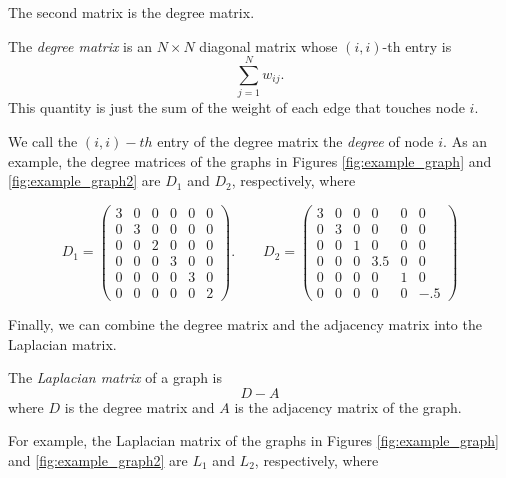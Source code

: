 The second matrix is the degree matrix. 
\begin{definition} The \emph{degree matrix} is an $N \times N$ diagonal matrix whose $(i,i)$-th entry is
\[ 
\sum_{j=1}^N w_{ij}.
\]
This quantity is just the sum of the weight of each edge that touches node $i$.
\end{definition}
We call the $(i, i)-th$ entry of the degree matrix the \emph{degree} of node $i$. As an example, the degree matrices of the graphs in Figures \ref{fig:example_graph} and \ref{fig:example_graph2} are $D_1$ and $D_2$, respectively, where

\[
D_1 = \begin{pmatrix}
3 & 0 & 0 & 0 & 0 & 0\\
0 & 3 & 0 & 0 & 0 & 0\\
0 & 0 & 2 & 0 & 0 & 0\\
0 & 0 & 0 & 3 & 0 & 0\\
0 & 0 & 0 & 0 & 3 & 0\\
0 & 0 & 0 & 0 & 0 & 2
\end{pmatrix}. \qquad D_2 = 
 \begin{pmatrix}
3 & 0 & 0 & 0 & 0 & 0\\
0 & 3 & 0 & 0 & 0 & 0\\
0 & 0 & 1 & 0 & 0 & 0\\
0 & 0 & 0 & 3.5 & 0 & 0\\
0 & 0 & 0 & 0 & 1 & 0\\
0 & 0 & 0 & 0 & 0 & -.5
\end{pmatrix}
\]

Finally, we can combine the degree matrix and the adjacency matrix into the Laplacian matrix.
\begin{definition}
The \emph{Laplacian matrix} of a graph is 
\[D - A \]
where $D$ is the degree matrix and $A$ is the adjacency matrix of the graph.
\end{definition}

For example, the Laplacian matrix of the graphs in Figures \ref{fig:example_graph} and \ref{fig:example_graph2} are $L_1$ and $L_2$, respectively, where


